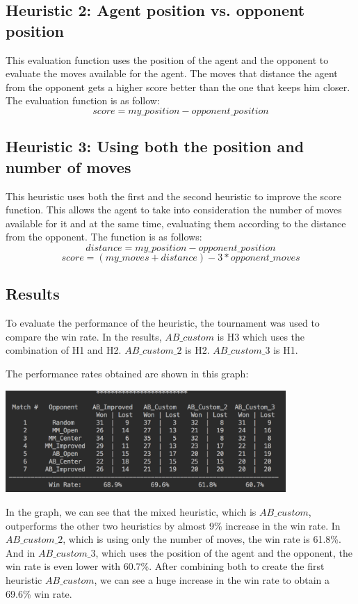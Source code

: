 \documentclass[10pt, a4paper,english]{article}
\begin{document}
\subsection{Heuristic 2: Agent position vs. opponent position}


This evaluation function uses the position of the agent and the opponent to evaluate the moves available for the agent. The moves that distance the agent from the opponent gets a higher score better than the one that keeps him closer. The evaluation function is as follow:
	$$score = my\_position - opponent\_position$$

\subsection{Heuristic 3: Using both the position and number of moves}


This heuristic uses both the first and the second heuristic to improve the score function. This allows the agent to take into consideration the number of moves available for it and at the same time, evaluating them according to the distance from the opponent. The function is as follows:
	$$distance = my\_position - opponent\_position$$
	$$score = (my\_moves + distance) - 3*opponent\_moves$$


\subsection{Results}

To evaluate the performance of the heuristic, the tournament was used to compare the win rate. In the results, $AB\_custom$ is H3 which uses the combination of H1 and H2. $AB\_custom\_2$ is H2. $AB\_custom\_3$ is H1.

The performance rates obtained are shown in this graph:


\begin{center}
\includegraphics[width=0.8\textwidth]{isolation-results.png}\\
\end{center}

In the graph, we can see that the mixed heuristic, which is $AB\_custom$, outperforms the other two heuristics by almost 9\% increase in the win rate. In $AB\_custom\_2$, which is using only the number of moves, the win rate is 61.8\%. And in $AB\_custom\_3$, which uses the position of the agent and the opponent, the win rate is even lower with 60.7\%. After combining both to create the first heuristic $AB\_custom$, we can see a huge increase in the win rate to obtain a 69.6\% win rate.
\end{document}
